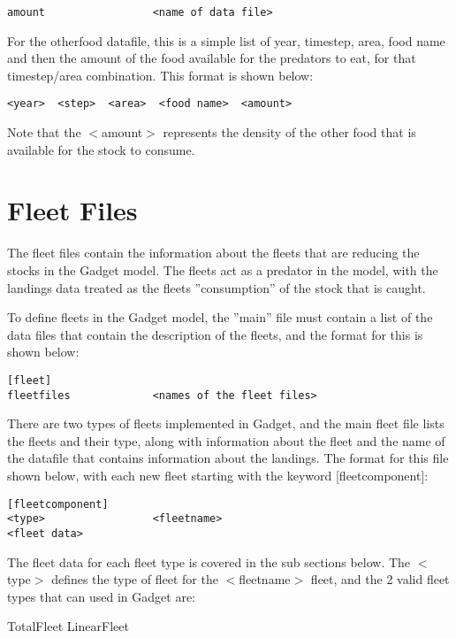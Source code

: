 \documentclass [a4paper, 10pt]{book}
\begin{document}
{\small\begin{verbatim}
amount                 <name of data file>
\end{verbatim}}

For the otherfood datafile, this is a simple list of year, timestep, area, food name and then the amount of the food available for the predators to eat, for that timestep/area combination.  This format is shown below:

{\small\begin{verbatim}
<year>  <step>  <area>  <food name>  <amount>
\end{verbatim}}

Note that the $<$amount$>$ represents the density of the other food that is available for the stock to consume.

\chapter{Fleet Files}\label{chap:fleet}
The fleet files contain the information about the fleets that are reducing the stocks in the Gadget model.  The fleets act as a predator in the model, with the landings data treated as the fleets ''consumption'' of the stock that is caught.

\bigskip
To define fleets in the Gadget model, the ''main'' file must contain a list of the data files that contain the description of the fleets, and the format for this is shown below:

{\small\begin{verbatim}
[fleet]
fleetfiles             <names of the fleet files>
\end{verbatim}}

There are two types of fleets implemented in Gadget, and the main fleet file lists the fleets and their type, along with information about the fleet and the name of the datafile that contains information about the landings.  The format for this file shown below, with each new fleet starting with the keyword [fleetcomponent]:

{\small\begin{verbatim}
[fleetcomponent]
<type>                 <fleetname>
<fleet data>
\end{verbatim}}

The fleet data for each fleet type is covered in the sub sections below.  The $<$type$>$ defines the type of fleet for the $<$fleetname$>$ fleet, and the 2 valid fleet types that can used in Gadget are:

\bigskip
TotalFleet\newline
LinearFleet
\end{document}
